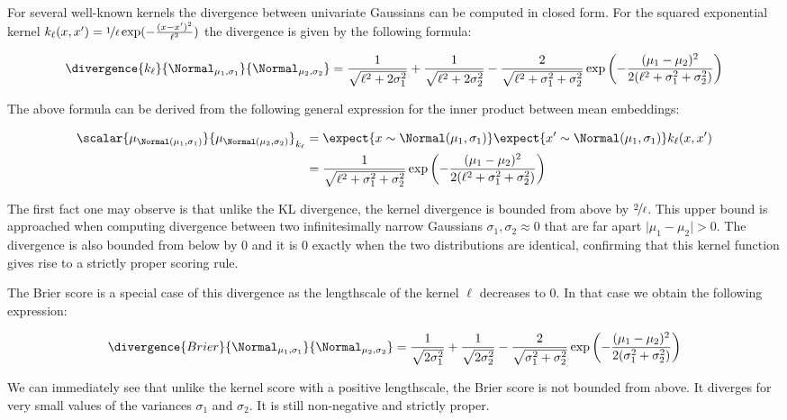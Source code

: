 For several well-known kernels the divergence between univariate Gaussians can be computed in closed form.\citep{tailoring_density} For the squared exponential kernel $k_{\ell}(x,x')=\nicefrac{1}{\ell}\exp(-\frac{(x-x')^2}{\ell^2})$ the divergence is given by the following formula:

\begin{equation}
	\divergence{k_{\ell}}{\Normal_{\mu_1,\sigma_1}}{\Normal_{\mu_2,\sigma_2}} = \frac{1}{\sqrt{\ell^2+2\sigma_1^2}} + \frac{1}{\sqrt{\ell^2+2\sigma_2^2}} - \frac{2}{\sqrt{\ell^2+\sigma_1^2 + \sigma_2^2}}\exp\left(-\frac{(\mu_1 - \mu_2)^2}{2(\ell^2 + \sigma_1^2 + \sigma_2^2)}\right)
\end{equation}

The above formula can be derived from the following general expression for the inner product between mean embeddings:

\begin{align}
	\scalar{\mu_{\Normal(\mu_1,\sigma_1)}}{\mu_{\Normal(\mu_2,\sigma_2)}}_{k_{\ell}} &= \expect{x\sim \Normal(\mu_1,\sigma_1)}\expect{x' \sim \Normal(\mu_1,\sigma_1)} k_{\ell}(x,x')\\
	&= \frac{1}{\sqrt{\ell^2 + \sigma_1^2 + \sigma_2^2}}\exp\left(-\frac{(\mu_1 - \mu_2)^2}{2(\ell^2 + \sigma_1^2 + \sigma_2^2)}\right)
\end{align} 

The first fact one may observe is that unlike the KL divergence, the kernel divergence is bounded from above by $\nicefrac{2}{\ell}$. This upper bound is approached when computing divergence between two infinitesimally narrow Gaussians $\sigma_1,\sigma_2\approx 0$ that are far apart $\vert \mu_1 - \mu_2 \vert > 0$. The divergence is also bounded from below by $0$ and it is $0$ exactly when the two distributions are identical, confirming that this kernel function gives rise to a strictly proper scoring rule.

The Brier score is a special case of this divergence as the lengthscale of the kernel $\ell$ decreases to $0$. In that case we obtain the following expression:

\begin{equation}
	\divergence{Brier}{\Normal_{\mu_1,\sigma_1}}{\Normal_{\mu_2,\sigma_2}} = \frac{1}{\sqrt{2\sigma_1^2}} + \frac{1}{\sqrt{2\sigma_2^2}} - \frac{2}{\sqrt{\sigma_1^2 + \sigma_2^2}}\exp\left(-\frac{(\mu_1 - \mu_2)^2}{2(\sigma_1^2 + \sigma_2^2)}\right)
\end{equation}

We can immediately see that unlike the kernel score with a positive lengthscale, the Brier score is not bounded from above. It diverges for very small values of the variances $\sigma_1$ and $\sigma_2$. It is still non-negative and strictly proper.

